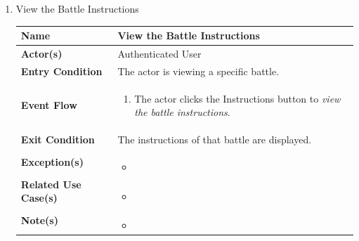 \begin{enumerate}
\item View the Battle Instructions
\begin{center}
    \begin{tabular}{ | m{10em} | m{10cm}| } 
      \hline
      \textbf{Name} & View the Battle Instructions \\ 
      \hline
      \textbf{Actor(s)} & Authenticated User \\ 
      \hline
      \textbf{Entry Condition} & The actor is viewing a specific battle. \\ 
      \hline
      \textbf{Event Flow} & 
          \begin{enumerate}[(1)]
              \item The actor clicks the Instructions button to \textit{view the battle instructions}.
          \end{enumerate}
      \\ 
      \hline
      \textbf{Exit Condition} & The instructions of that battle are displayed.  \\ 
      \hline
      \textbf{Exception(s)} & 
      \begin{itemize}
          \item 
      \end{itemize}
          \\ 
      \hline
      \textbf{Related Use Case(s)} & 
      \begin{itemize}
          \item 
      \end{itemize}
          \\ 
      \hline
      \textbf{Note(s)} & 
      \begin{itemize}
          \item 
      \end{itemize}
          \\ 
      \hline
    \end{tabular}
\end{center}


\end{enumerate}
